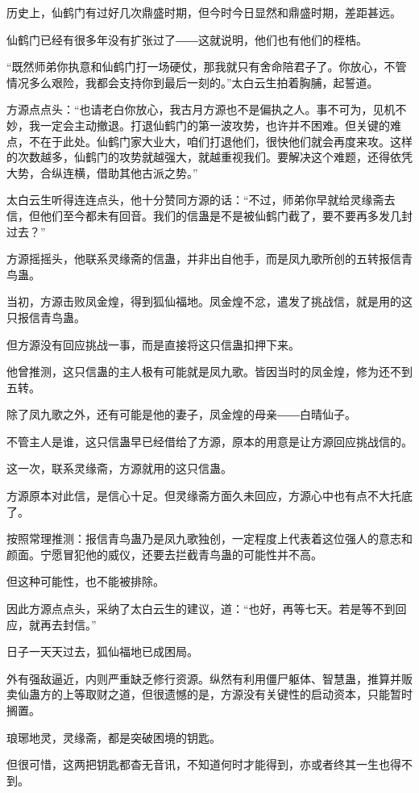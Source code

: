\begin{this_body}
历史上，仙鹤门有过好几次鼎盛时期，但今时今日显然和鼎盛时期，差距甚远。

仙鹤门已经有很多年没有扩张过了――这就说明，他们也有他们的桎梏。

“既然师弟你执意和仙鹤门打一场硬仗，那我就只有舍命陪君子了。你放心，不管情况多么艰险，我都会支持你到最后一刻的。”太白云生拍着胸脯，起誓道。

方源点点头：“也请老白你放心，我古月方源也不是偏执之人。事不可为，见机不妙，我一定会主动撤退。打退仙鹤门的第一波攻势，也许并不困难。但关键的难点，不在于此处。仙鹤门家大业大，咱们打退他们，很快他们就会再度来攻。这样的次数越多，仙鹤门的攻势就越强大，就越重视我们。要解决这个难题，还得依凭大势，合纵连横，借助其他古派之势。”

太白云生听得连连点头，他十分赞同方源的话：“不过，师弟你早就给灵缘斋去信，但他们至今都未有回音。我们的信蛊是不是被仙鹤门截了，要不要再多发几封过去？”

方源摇摇头，他联系灵缘斋的信蛊，并非出自他手，而是凤九歌所创的五转报信青鸟蛊。

当初，方源击败凤金煌，得到狐仙福地。凤金煌不忿，遣发了挑战信，就是用的这只报信青鸟蛊。

但方源没有回应挑战一事，而是直接将这只信蛊扣押下来。

他曾推测，这只信蛊的主人极有可能就是凤九歌。皆因当时的凤金煌，修为还不到五转。

除了凤九歌之外，还有可能是他的妻子，凤金煌的母亲――白晴仙子。

不管主人是谁，这只信蛊早已经借给了方源，原本的用意是让方源回应挑战信的。

这一次，联系灵缘斋，方源就用的这只信蛊。

方源原本对此信，是信心十足。但灵缘斋方面久未回应，方源心中也有点不大托底了。

按照常理推测：报信青鸟蛊乃是凤九歌独创，一定程度上代表着这位强人的意志和颜面。宁愿冒犯他的威仪，还要去拦截青鸟蛊的可能性并不高。

但这种可能性，也不能被排除。

因此方源点点头，采纳了太白云生的建议，道：“也好，再等七天。若是等不到回应，就再去封信。”

日子一天天过去，狐仙福地已成困局。

外有强敌逼近，内则严重缺乏修行资源。纵然有利用僵尸躯体、智慧蛊，推算并贩卖仙蛊方的上等取财之道，但很遗憾的是，方源没有关键性的启动资本，只能暂时搁置。

琅琊地灵，灵缘斋，都是突破困境的钥匙。

但很可惜，这两把钥匙都杳无音讯，不知道何时才能得到，亦或者终其一生也得不到。


\end{this_body}

